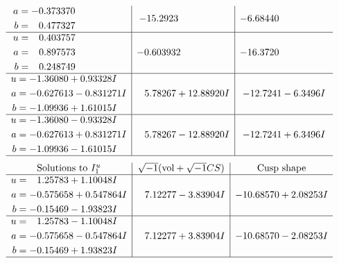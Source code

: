 \documentclass[1p]{elsarticle_modified}
\theoremstyle{definition}
\newcommand{\I}{\sqrt{-1}}
\begin{document}
$$\begin{array}{c|c|c}
\begin{aligned}
a &= -0.373370\phantom{ +0.000000I} \\
b &= \phantom{-}0.477327\phantom{ +0.000000I}\end{aligned}
 & -15.2923\phantom{ +0.000000I} & -6.68440\phantom{ +0.000000I} \\ \hline\begin{aligned}
u &= \phantom{-}0.403757\phantom{ +0.000000I} \\
a &= \phantom{-}0.897573\phantom{ +0.000000I} \\
b &= \phantom{-}0.248749\phantom{ +0.000000I}\end{aligned}
 & -0.603932\phantom{ +0.000000I} & -16.3720\phantom{ +0.000000I} \\ \hline\begin{aligned}
u &= -1.36080 + 0.93328 I \\
a &= -0.627613 - 0.831271 I \\
b &= -1.09936 + 1.61015 I\end{aligned}
 & \phantom{-}5.78267 + 12.88920 I & -12.7241 - 6.3496 I \\ \hline\begin{aligned}
u &= -1.36080 - 0.93328 I \\
a &= -0.627613 + 0.831271 I \\
b &= -1.09936 - 1.61015 I\end{aligned}
 & \phantom{-}5.78267 - 12.88920 I & -12.7241 + 6.3496 I\\
 \hline 
 \end{array}$$\newpage$$\begin{array}{c|c|c}  
\text{Solutions to }I^u_{1}& \I (\text{vol} + \sqrt{-1}CS) & \text{Cusp shape}\\
 \hline 
\begin{aligned}
u &= \phantom{-}1.25783 + 1.10048 I \\
a &= -0.575658 + 0.547864 I \\
b &= -0.15469 - 1.93823 I\end{aligned}
 & \phantom{-}7.12277 - 3.83904 I & -10.68570 + 2.08253 I \\ \hline\begin{aligned}
u &= \phantom{-}1.25783 - 1.10048 I \\
a &= -0.575658 - 0.547864 I \\
b &= -0.15469 + 1.93823 I\end{aligned}
 & \phantom{-}7.12277 + 3.83904 I & -10.68570 - 2.08253 I\\
 \hline 
 \end{array}$$\newpage\newpage\renewcommand{\arraystretch}{1}
\end{document}
